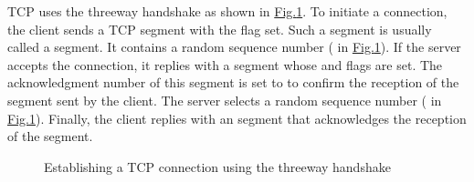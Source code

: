 \documentclass[letterpaper,10pt,english]{sphinxmanual}
\begin{document}
\sphinxAtStartPar
TCP uses the three\sphinxhyphen{}way handshake as shown in \hyperref[\detokenize{tcp:fig-tcp-handshake}]{Fig.\@ \ref{\detokenize{tcp:fig-tcp-handshake}}}. To initiate a connection, the client sends a TCP segment with the  flag set. Such a segment is usually called a  segment. It contains a random sequence number ( in \hyperref[\detokenize{tcp:fig-tcp-handshake}]{Fig.\@ \ref{\detokenize{tcp:fig-tcp-handshake}}}). If the server accepts the connection, it replies with a  segment whose  and  flags are set. The acknowledgment number of this segment is set to  to confirm the reception of the  segment sent by the client. The server selects a random sequence number ( in \hyperref[\detokenize{tcp:fig-tcp-handshake}]{Fig.\@ \ref{\detokenize{tcp:fig-tcp-handshake}}}). Finally, the client replies with an  segment that acknowledges the reception of the  segment.
\begin{figure}[htbp]\centering\capstart{}\caption{Establishing a TCP connection using the three\sphinxhyphen{}way handshake}\label{\detokenize{tcp:id5}}\label{\detokenize{tcp:fig-tcp-handshake}}\end{figure}
\sphinxAtStartPar
\end{document}
